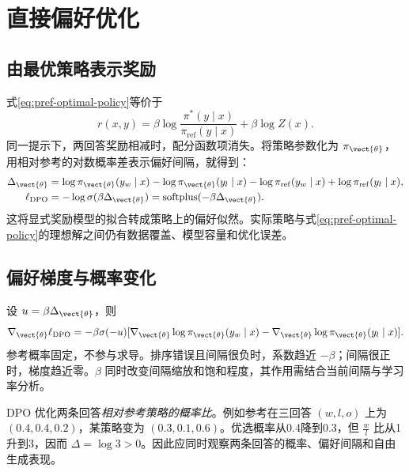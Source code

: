 \documentclass[../textbook.tex]{subfiles}
\begin{document}
\section{直接偏好优化}

\subsection{由最优策略表示奖励}
式\eqref{eq:pref-optimal-policy}等价于
\begin{equation}
 r(x,y)=\beta\log\frac{\pi^*(y\mid x)}{\pi_{\mathrm{ref}}(y\mid x)}+\beta\log Z(x).
\end{equation}
同一提示下，两回答奖励相减时，配分函数项消失。将策略参数化为 $\pi_{\vect{\theta}}$，用相对参考的对数概率差表示偏好间隔，就得到\autocite{rafailov2023dpo}：
\begin{align}
 \Delta_{\vect{\theta}}&=\log\pi_{\vect{\theta}}(y_w\mid x)-\log\pi_{\vect{\theta}}(y_l\mid x)
 -\log\pi_{\mathrm{ref}}(y_w\mid x)+\log\pi_{\mathrm{ref}}(y_l\mid x),\\
 \ell_{\mathrm{DPO}}&=-\log\sigma(\beta\Delta_{\vect{\theta}})
 =\operatorname{softplus}(-\beta\Delta_{\vect{\theta}}).
 \label{eq:pref-dpo}
\end{align}
这将显式奖励模型的拟合转成策略上的偏好似然。实际策略与式\eqref{eq:pref-optimal-policy}的理想解之间仍有数据覆盖、模型容量和优化误差。


\subsection{偏好梯度与概率变化}
设 $u=\beta\Delta_{\vect{\theta}}$，则
\begin{equation}
 \nabla_{\vect{\theta}}\ell_{\mathrm{DPO}}
 =-\beta\sigma(-u)
 [\nabla_{\vect{\theta}}\log\pi_{\vect{\theta}}(y_w\mid x)
 -\nabla_{\vect{\theta}}\log\pi_{\vect{\theta}}(y_l\mid x)].
 \label{eq:pref-dpo-gradient}
\end{equation}
参考概率固定，不参与求导。排序错误且间隔很负时，系数趋近 $-\beta$；间隔很正时，梯度趋近零。$\beta$ 同时改变间隔缩放和饱和程度，其作用需结合当前间隔与学习率分析。

DPO 优化两条回答\emph{相对参考策略的概率比}。例如参考在三回答 $(w,l,o)$ 上为 $(0.4,0.4,0.2)$，某策略变为 $(0.3,0.1,0.6)$。优选概率从0.4降到0.3，但 $\frac{w}{l}$ 比从1升到3，因而 $\Delta=\log3>0$。因此应同时观察两条回答的概率、偏好间隔和自由生成表现。
\end{document}
